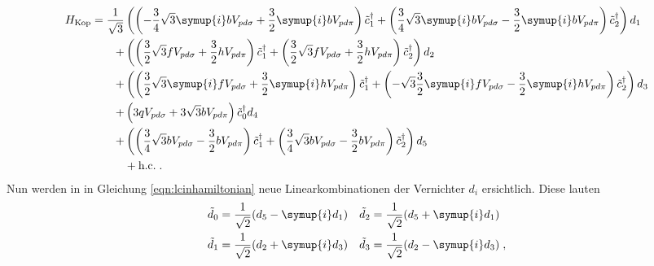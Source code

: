 \begin{equation}
    \begin{split}
    H_\text{Kop} = \frac{1}{\sqrt{3}} 
        &\left  (   \left   (-\frac{3}{4}\sqrt{3}   \symup{i}    b   V_{pd\sigma} + \frac{3}{2}  \symup{i}   b   V_{pd\pi} \right ) \tilde{c}^\dagger_1  
                    +\left  ( \frac{3}{4}\sqrt{3}   \symup{i}    b   V_{pd\sigma} - \frac{3}{2}  \symup{i}   b   V_{pd\pi} \right ) \tilde{c}^\dagger_2 \right )            d_1\\
        +&\left (    \left  ( \frac{3}{2}\sqrt{3}                           f   V_{pd\sigma} + \frac{3}{2}              h   V_{pd\pi} \right ) \tilde{c}^\dagger_1          
                    +\left  ( \frac{3}{2}\sqrt{3}                           f   V_{pd\sigma} + \frac{3}{2}              h   V_{pd\pi} \right ) \tilde{c}^\dagger_2 \right ) d_2\\
        +&\left (    \left  ( \frac{3}{2}\sqrt{3}               \symup{i}   f   V_{pd\sigma} + \frac{3}{2}  \symup{i}   h   V_{pd\pi} \right ) \tilde{c}^\dagger_1  
                    +\left  (-\sqrt{3}\frac{3}{2}               \symup{i}   f   V_{pd\sigma} - \frac{3}{2}  \symup{i}   h   V_{pd\pi} \right ) \tilde{c}^\dagger_2 \right ) d_3\\
        +&\left (   3 q V_{pd\sigma} + 3 \sqrt{3}  b V_{pd\pi} \right )    \tilde{c}^\dagger_0                                                                              d_4\\
        +&\left (   \left   ( \frac{3}{4}\sqrt{3}                           b   V_{pd\sigma} - \frac{3}{2}              b   V_{pd\pi} \right ) \tilde{c}^\dagger_1  
                    +\left  ( \frac{3}{4}\sqrt{3}                           b   V_{pd\sigma} - \frac{3}{2}              b   V_{pd\pi} \right ) \tilde{c}^\dagger_2 \right ) d_5\\
                    & + \text{h.c.} \; .
                 \end{split}
      \label{eqn:lcinhamiltonian}
\end{equation} 
Nun werden in in Gleichung \eqref{eqn:lcinhamiltonian} neue Linearkombinationen der Vernichter $d_i$ ersichtlich.
Diese lauten 
\begin{equation}
    \begin{aligned}
    \tilde{d}_0 &= \frac{1}{\sqrt{2}} (d_5-\symup{i}d_1) & \tilde{d}_2 &= \frac{1}{\sqrt{2}} (d_5+\symup{i}d_1) \\
    \tilde{d}_1 &= \frac{1}{\sqrt{2}} (d_2+\symup{i}d_3) & \tilde{d}_3 &= \frac{1}{\sqrt{2}} (d_2-\symup{i}d_3) \; , \label{eqn:newdi}
    \end{aligned}
\end{equation}
